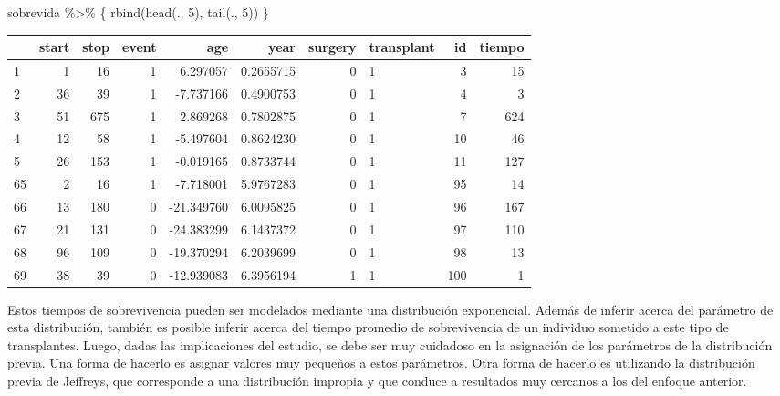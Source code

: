\documentclass[
  10pt,
  spanish,
]{book}
\newenvironment{Shaded}{\begin{snugshade}}{\end{snugshade}}
\newcommand{\DecValTok}[1]{\textcolor[rgb]{0.00,0.00,0.81}{#1}}
\newcommand{\FunctionTok}[1]{\textcolor[rgb]{0.00,0.00,0.00}{#1}}
\newcommand{\NormalTok}[1]{#1}
\newcommand{\SpecialCharTok}[1]{\textcolor[rgb]{0.00,0.00,0.00}{#1}}
\theoremstyle{definition}
\theoremstyle{definition}
\theoremstyle{definition}
\theoremstyle{definition}
\theoremstyle{remark}
\begin{document}
\begin{Shaded}
\begin{Highlighting}[]
\NormalTok{sobrevida }\SpecialCharTok{\%\textgreater{}\%}\NormalTok{ \{}
  \FunctionTok{rbind}\NormalTok{(}\FunctionTok{head}\NormalTok{(., }\DecValTok{5}\NormalTok{), }\FunctionTok{tail}\NormalTok{(., }\DecValTok{5}\NormalTok{))}
\NormalTok{\}}
\end{Highlighting}
\end{Shaded}

\begin{tabular}{l|r|r|r|r|r|r|l|r|r}
\hline
  & start & stop & event & age & year & surgery & transplant & id & tiempo\\
\hline
1 & 1 & 16 & 1 & 6.297057 & 0.2655715 & 0 & 1 & 3 & 15\\
\hline
2 & 36 & 39 & 1 & -7.737166 & 0.4900753 & 0 & 1 & 4 & 3\\
\hline
3 & 51 & 675 & 1 & 2.869268 & 0.7802875 & 0 & 1 & 7 & 624\\
\hline
4 & 12 & 58 & 1 & -5.497604 & 0.8624230 & 0 & 1 & 10 & 46\\
\hline
5 & 26 & 153 & 1 & -0.019165 & 0.8733744 & 0 & 1 & 11 & 127\\
\hline
65 & 2 & 16 & 1 & -7.718001 & 5.9767283 & 0 & 1 & 95 & 14\\
\hline
66 & 13 & 180 & 0 & -21.349760 & 6.0095825 & 0 & 1 & 96 & 167\\
\hline
67 & 21 & 131 & 0 & -24.383299 & 6.1437372 & 0 & 1 & 97 & 110\\
\hline
68 & 96 & 109 & 0 & -19.370294 & 6.2039699 & 0 & 1 & 98 & 13\\
\hline
69 & 38 & 39 & 0 & -12.939083 & 6.3956194 & 1 & 1 & 100 & 1\\
\hline
\end{tabular}

Estos tiempos de sobrevivencia pueden ser modelados mediante una distribución exponencial. Además de inferir acerca del parámetro de esta distribución, también es posible inferir acerca del tiempo promedio de sobrevivencia de un individuo sometido a este tipo de transplantes. Luego, dadas las implicaciones del estudio, se debe ser muy cuidadoso en la asignación de los parámetros de la distribución previa. Una forma de hacerlo es asignar valores muy pequeños a estos parámetros. Otra forma de hacerlo es utilizando la distribución previa de Jeffreys, que corresponde a una distribución impropia y que conduce a resultados muy cercanos a los del enfoque anterior.
\end{document}
